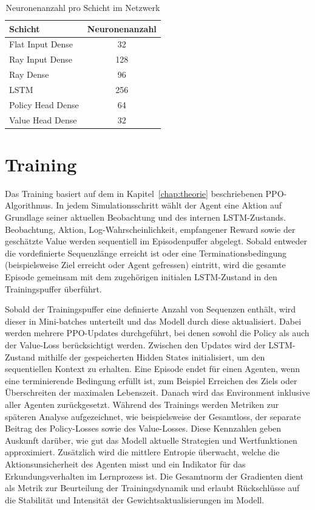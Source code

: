\begin{table}[htbp]
\centering
\caption{Neuronenanzahl pro Schicht im Netzwerk}
\label{tab:neuronenanzahl}
\begin{tabular}{lc}
\toprule
Schicht & Neuronenanzahl \\
\midrule
Flat Input Dense & 32 \\
Ray Input Dense & 128 \\
Ray Dense & 96 \\
LSTM & 256 \\
Policy Head Dense & 64 \\
Value Head Dense & 32 \\
\bottomrule
\end{tabular}
\end{table}

\section{Training}
Das Training basiert auf dem in Kapitel~\ref{chap:theorie} beschriebenen PPO-Algorithmus. In jedem Simulationsschritt wählt der Agent eine Aktion auf Grundlage seiner aktuellen Beobachtung und des internen LSTM-Zustands. Beobachtung, Aktion, Log-Wahrscheinlichkeit, empfangener Reward sowie der geschätzte Value werden sequentiell im Episodenpuffer abgelegt. Sobald entweder die vordefinierte Sequenzlänge erreicht ist oder eine Terminationsbedingung (beispielsweise Ziel erreicht oder Agent gefressen) eintritt, wird die gesamte Episode gemeinsam mit dem zugehörigen initialen LSTM-Zustand in den Trainingspuffer überführt.

Sobald der Trainingspuffer eine definierte Anzahl von Sequenzen enthält, wird dieser in Mini-batches unterteilt und das Modell durch diese aktualisiert. Dabei werden mehrere PPO-Updates durchgeführt, bei denen sowohl die Policy als auch der Value-Loss berücksichtigt werden. Zwischen den Updates wird der LSTM-Zustand mithilfe der gespeicherten Hidden States initialisiert, um den sequentiellen Kontext zu erhalten. Eine Episode endet für einen Agenten, wenn eine terminierende Bedingung erfüllt ist, zum Beispiel Erreichen des Ziels oder Überschreiten der maximalen Lebenszeit. Danach wird das Environment inklusive aller Agenten zurückgesetzt. Während des Trainings werden Metriken zur späteren Analyse aufgezeichnet, wie beispielsweise  der Gesamtloss, der separate Beitrag des Policy-Losses sowie des Value-Losses. Diese Kennzahlen geben Auskunft darüber, wie gut das Modell aktuelle Strategien und Wertfunktionen approximiert. Zusätzlich wird die mittlere Entropie überwacht, welche die Aktionsunsicherheit des Agenten misst und ein Indikator für das Erkundungsverhalten im Lernprozess ist. Die Gesamtnorm der Gradienten dient als Metrik zur Beurteilung der Trainingsdynamik und erlaubt Rückschlüsse auf die Stabilität und Intensität der Gewichtsaktualisierungen im Modell.

